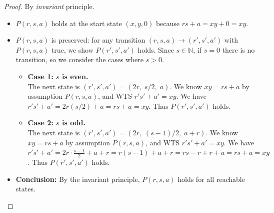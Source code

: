 \documentclass[11pt]{article}
\theoremstyle{definition}
\begin{document}
\begin{proof}
	By \emph{invariant} principle.
	\begin{itemize}
		\item $P(r, s, a)$ holds at the start state $(x, y, 0)$ because
		      $rs + a = xy + 0 = xy$.
		\item $P(r, s, a)$ is preserved: for any transition
		      $(r, s, a) \to (r', s', a')$ with $P(r, s, a)$ true,
		      we show $P(r', s', a')$ holds.
		      Since $s \in \mathbb{N}$, if $s = 0$ there is no transition,
		      so we consider the cases where $s > 0$.
		      \begin{itemize}
			      \item \textbf{Case 1: $s$ is even.}
			            \\
			            The next state is $(r', s', a') = (2r,\; s/2,\; a)$.
			            We know $xy = rs + a$ by assumption $P(r, s, a)$,
			            and WTS $r's' + a' = xy$.
			            We have $r's' + a' = 2r(s/2) + a = rs + a = xy$.
			            Thus $P(r', s', a')$ holds.
			            \\
			      \item \textbf{Case 2: $s$ is odd.}
			            \\
			            The next state is $(r', s', a') = (2r,\; (s-1)/2,\; a + r)$.
			            We know $xy = rs + a$ by assumption $P(r, s, a)$,
			            and WTS $r's' + a' = xy$.
			            We have $r's' + a' = 2r \cdot \frac{s-1}{2} + a + r
				            = r(s-1) + a + r = rs - r + r + a = rs + a = xy$.
			            Thus $P(r', s', a')$ holds.
		      \end{itemize}
		\item \textbf{Conclusion:} By the invariant principle,
		      $P(r, s, a)$ holds for all reachable states.
	\end{itemize}
\end{proof}

\vspace{1cm}
\end{document}
